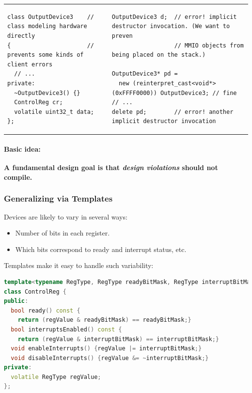 \begin{tabular}{|p{9.2cm}|p{9.2cm}|}
\begin{lstlisting}
class OutputDevice3    // class modeling hardware directly
{                      // prevents some kinds of client errors
  // ...
private:
  ~OutputDevice3() {}
  ControlReg cr;
  volatile uint32_t data;
};
\end{lstlisting}
&
\begin{lstlisting}
OutputDevice3 d;  // error! implicit destructor invocation. (We want to preven
                  // MMIO objects from being placed on the stack.)

OutputDevice3* pd =
  new (reinterpret_cast<void*>(0xFFFF0000)) OutputDevice3; // fine
// ...
delete pd;        // error! another implicit destructor invocation
\end{lstlisting}
\end{tabular}

\paragraph{Basic idea:}
\textbf{A fundamental design goal is that \textit{design violations} should not compile.}

\subsubsection{Generalizing via Templates}
Devices are likely to vary in several ways:
\begin{itemize}
  \item Number of bits in each register.
  \item Which bits correspond to ready and interrupt status, etc.
\end{itemize}
Templates make it easy to handle such variability:
\begin{lstlisting}[language=C++]
template<typename RegType, RegType readyBitMask, RegType interruptBitMask>
class ControlReg {
public:
  bool ready() const {
    return (regValue & readyBitMask) == readyBitMask;}
  bool interruptsEnabled() const {
    return (regValue & interruptBitMask) == interruptBitMask;}
  void enableInterrupts() {regValue |= interruptBitMask;}
  void disableInterrupts() {regValue &= ~interruptBitMask;}
private:
  volatile RegType regValue;
};
\end{lstlisting}

